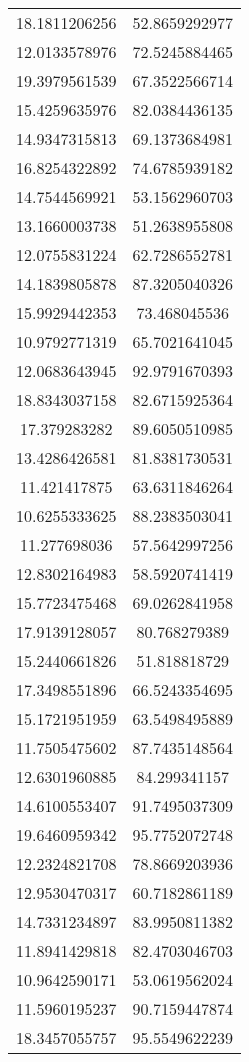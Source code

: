 \begin{table}
\begin{tabular}{cc}
18.1811206256 & 52.8659292977 \\
12.0133578976 & 72.5245884465 \\
19.3979561539 & 67.3522566714 \\
15.4259635976 & 82.0384436135 \\
14.9347315813 & 69.1373684981 \\
16.8254322892 & 74.6785939182 \\
14.7544569921 & 53.1562960703 \\
13.1660003738 & 51.2638955808 \\
12.0755831224 & 62.7286552781 \\
14.1839805878 & 87.3205040326 \\
15.9929442353 & 73.468045536 \\
10.9792771319 & 65.7021641045 \\
12.0683643945 & 92.9791670393 \\
18.8343037158 & 82.6715925364 \\
17.379283282 & 89.6050510985 \\
13.4286426581 & 81.8381730531 \\
11.421417875 & 63.6311846264 \\
10.6255333625 & 88.2383503041 \\
11.277698036 & 57.5642997256 \\
12.8302164983 & 58.5920741419 \\
15.7723475468 & 69.0262841958 \\
17.9139128057 & 80.768279389 \\
15.2440661826 & 51.818818729 \\
17.3498551896 & 66.5243354695 \\
15.1721951959 & 63.5498495889 \\
11.7505475602 & 87.7435148564 \\
12.6301960885 & 84.299341157 \\
14.6100553407 & 91.7495037309 \\
19.6460959342 & 95.7752072748 \\
12.2324821708 & 78.8669203936 \\
12.9530470317 & 60.7182861189 \\
14.7331234897 & 83.9950811382 \\
11.8941429818 & 82.4703046703 \\
10.9642590171 & 53.0619562024 \\
11.5960195237 & 90.7159447874 \\
18.3457055757 & 95.5549622239 \\

\end{tabular}
\end{table}
